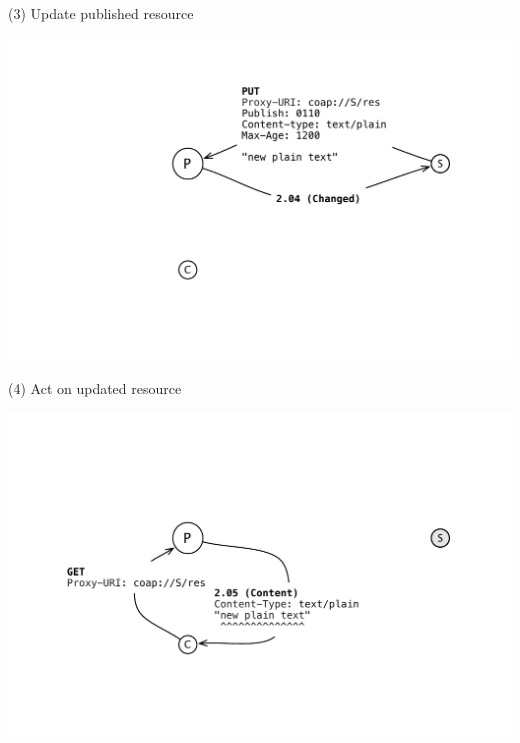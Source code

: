 \documentclass{beamer}
\begin{document}
\begin{frame}{(3) Update published resource}
 \begin{center}
  \includegraphics[width=\textwidth]{../../share/images/publish2.pdf}
 \end{center}
\end{frame}

\begin{frame}{(4) Act on updated resource}
 \begin{center}
  \includegraphics[width=\textwidth]{../../share/images/publish3.pdf}
 \end{center}
\end{frame}
\end{document}
